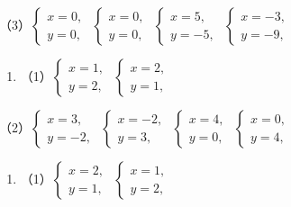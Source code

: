 （3）\(\left\{ \begin{array}{l} x = 0, \\ y = 0, \end{array} \right.\) \(\left\{ \begin{array}{l} x = 0, \\ y = 0, \end{array} \right.\) \(\left\{ \begin{array}{ll} x = 5, \\ y = -5, \end{array} \right.\) \(\left\{ \begin{array}{ll} x = -3, \\ y = -9, \end{array} \right.\)

\begin{enumerate}[start=4]
\item
  （1）\(\left\{ \begin{array}{l} x = 1, \\ y = 2, \end{array} \right.\) \(\left\{ \begin{array}{l} x = 2, \\ y = 1, \end{array} \right.\)
\end{enumerate}

（2）\(\left\{ \begin{array}{l} x = 3, \\ y = -2, \end{array} \right.\) \(\left\{ \begin{array}{l} x = -2, \\ y = 3, \end{array} \right.\) \(\left\{ \begin{array}{l} x = 4, \\ y = 0, \end{array} \right.\) \(\left\{ \begin{array}{l} x = 0, \\ y = 4, \end{array} \right.\)

\begin{enumerate}[start=5]
\item
  （1）\(\left\{ \begin{array}{l} x = 2, \\ y = 1, \end{array} \right.\) \(\left\{ \begin{array}{l} x = 1, \\ y = 2, \end{array} \right.\)
\end{enumerate}

